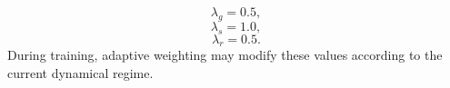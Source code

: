 \begin{equation} \lambda_g=0.5, \end{equation} \begin{equation} \lambda_s=1.0, \end{equation} \begin{equation} \lambda_r=0.5. \end{equation} During training, adaptive weighting may modify these values according to the current dynamical regime. %
